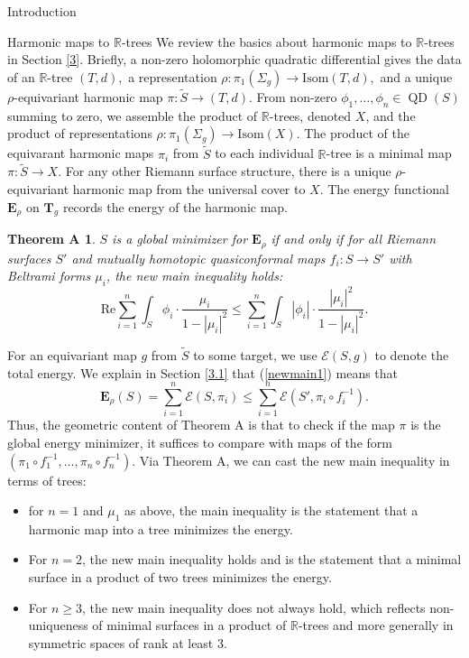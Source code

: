 \documentclass[10pt]{amsart}
\newcommand{\R}{\mathbb R}
\newtheorem*{thma}{Theorem A}
\DeclareMathOperator{\QD}{\textrm{QD}}
\theoremstyle{definition}
\begin{document}
\begin{section}{Introduction}
\begin{subsection}{Harmonic maps to $\R$-trees}
We review the basics about harmonic maps to $\mathbb{R}$-trees in Section \ref{3}. Briefly, a non-zero holomorphic quadratic differential gives the data of an $\R$-tree $(T,d),$ a representation $\rho:\pi_1(\Sigma_g)\to \textrm{Isom}(T,d),$ and a unique $\rho$-equivariant harmonic map $\pi: \tilde{S}\to (T,d).$ From non-zero $\phi_1, \ldots, \phi_n\in \QD(S)$ summing to zero, we assemble the product of $\mathbb{R}$-trees, denoted $X$, and the product of representations $\rho:\pi_1(\Sigma_g)\to \textrm{Isom}(X)$. The product of the equivarant harmonic maps $\pi_i$ from $\tilde{S}$ to each individual $\R$-tree is a minimal map $\pi:\tilde{S}\to X$. For any other Riemann surface structure, there is a unique $\rho$-equivariant harmonic map from the universal cover to $X$. The energy functional $\mathbf{E}_\rho$ on $\mathbf{T}_g$ records the energy of the harmonic map.
\begin{thma}
 $S$ is a global minimizer for $\mathbf{E}_\rho$ if and only if for all Riemann surfaces $S'$ and mutually homotopic quasiconformal maps $f_i: S\to S'$ with Beltrami forms $\mu_i$, the new main inequality holds: 
$$\textrm{Re}\sum_{i=1}^n \int_S \phi_i\cdot \frac{ \mu_i}{1-|\mu_i|^2} \leq \sum_{i=1}^n \int_S |\phi_i|\cdot \frac{|\mu_i|^2}{1-|\mu_i|^2}.$$
\end{thma}
For an equivariant map $g$ from $\tilde{S}$ to some target, we use $\mathcal{E}(S,g)$ to denote the total energy. We explain in Section \ref{3.1} that (\ref{newmain1}) means that $$\mathbf{E}_\rho(S)=\sum_{i=1}^n\mathcal{E}(S,\pi_i)\leq \sum_{i=1}^n\mathcal{E}(S',\pi_i\circ f_i^{-1}).$$ Thus, the geometric content of Theorem A is that to check if the map $\pi$ is the global energy minimizer, it suffices to compare with maps of the form $(\pi_1\circ f_1^{-1},
\dots, \pi_n\circ f_n^{-1}).$ Via Theorem A, we can cast the new main inequality in terms of trees:
\begin{itemize}
    \item for $n=1$ and $\mu_1$ as above, the main inequality is the statement that a harmonic map into a tree minimizes the energy. 
    \item For $n=2$, the new main inequality holds \cite[Section 4]{M1} and is the statement that a minimal surface in a product of two trees minimizes the energy.
    \item For $n\geq 3$, the new main inequality does not always hold, which reflects non-uniqueness of minimal surfaces in a product of $\mathbb{R}$-trees and more generally in symmetric spaces of rank at least $3$.
\end{itemize}

\end{subsection}
\end{section}
\end{document}
